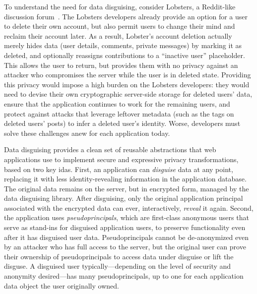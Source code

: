 %
%
To understand the need for data disguising, consider Lobsters, a Reddit-like
discussion forum~\cite{lobsters}.
%
The Lobsters developers already provide an option for a user to delete their own
account, but also permit users to change their mind and reclaim their
account later.
%
As a result, Lobster's account deletion actually merely hides data (\eg user
details, comments, private messages) by marking it as deleted, and optionally
reassigns contributions to a ``inactive user'' placeholder.
%
This allows the user to return, but provides them with no privacy against an
attacker who compromises the server while the user is in deleted state.
%
Providing this privacy would impose a high burden on the
Lobsters developers: they would need to devise their own cryptographic
server-side storage for deleted users' data,
%
ensure that the application continues to work for the remaining users, and
protect against attacks that leverage leftover metadata (such as the tags on
deleted users' posts) to infer a deleted user's identity.
%
Worse, developers must solve these challenges anew for each application
today.
%

%
%
Data disguising provides a clean set of reusable abstractions that web
applications use to implement secure and expressive privacy transformations,
based on two key idas.
%
%
First, an application can \emph{disguise} data at any point, replacing it with
less identity-revealing information in the application database.
%
The original data remains on the server, but in encrypted form, managed by the
data disguising library.
%
After disguising, only the original application principal associated with the
encrypted data can ever, interactively, \emph{reveal} it again.
%
Second, the application uses \emph{pseudoprincipals}, which are first-class
anonymous users that serve as stand-ins for disguised application users, to
preserve functionality even after it has disguised user data.
%
Pseudoprincipals cannot be de-anonymized even by an attacker who has full
access to the server, but the original user can prove their ownership of
pseudoprincipals to access data under disguise or lift the disguse.
%
A disguised user typically---depending on the level of security and anonymity
desired---has many pseudoprincipals, up to one for each application data
object the user originally owned.
%

